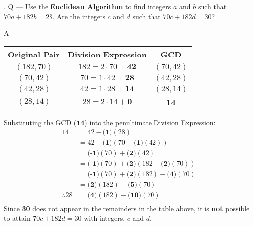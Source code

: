 \documentclass{article}
\newcounter{question}
\begin{document}
\newcommand\Que[1]{%
   \leavevmode\par
   \stepcounter{question}
   \noindent
   \thequestion. Q --- #1\par}

\newcommand\Ans[2][]{%
    \leavevmode\par\noindent
   {\leftskip37pt
    A --- \textbf{#1}#2\par}}

\Que{
    Use the \textbf{Euclidean Algorithm} to find integers $a$ and $b$ such that 
    $70a+182b=28$.
    Are the integers $c$ and $d$ such that $70c+182d=30$?
    }
\Ans{
    \begin{center}
    \begin{tabular}{|c c c|} 
    \hline
    Original Pair & Division Expression & GCD \\ [0.5ex] 
    \hline
    $(182, 70)$ & $182=2\cdot{70}+\textbf{42}$ & $(70, 42)$ \\ 
    $(70, 42)$ & $70=1\cdot{42}+\textbf{28}$ & $(42, 28)$ \\ 
    $(42, 28)$ & $42=1\cdot{28}+\textbf{14}$ & $(28, 14)$ \\ 
    $(28, 14)$ & $28=2\cdot{14}+\textbf{0}$ & \textbf{14}  \\ 
    \hline
    \end{tabular}
    \end{center}
    Substituting the GCD ($\textbf{14}$) 
    into the penultimate Division Expression:
    \begin{equation*}
        \begin{aligned}
        14  &=  42 - \textbf{(1)}(28)\\
            &=  42 - \textbf{(1)}(70 - \textbf{(1)}(42))\\
            &=  \textbf{(-1)}(70) + \textbf{(2)}(42)\\
            &=  \textbf{(-1)}(70) + \textbf{(2)}(182 - \textbf{(2)}(70))\\
            &=  \textbf{(-1)}(70) + \textbf{(2)}(182) - \textbf{(4)}(70)\\
            &=  \textbf{(2)}(182) - \textbf{(5)}(70)\\
        \therefore 
        28  &=  \textbf{(4)}(182) - \textbf{(10)}(70)\\
        \end{aligned}
    \end{equation*}
    Since \textbf{30} does not appear in the remainders in the table above,
    it is \textbf{not} possible to attain $70c+182d=30$ with integers, $c$ and $d$.    
    }
\end{document}
